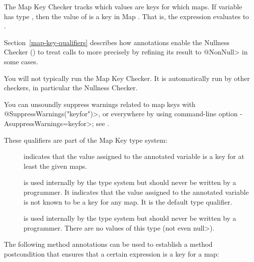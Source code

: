 \htmlhr
{}

The Map Key Checker tracks which values are keys for which maps.  If variable
 has type , then the value of  is a key
in Map .  That is, the expression  evaluates to
.

Section~\ref{map-key-qualifiers} describes how  annotations
enable the
Nullness Checker () to treat calls to
more precisely by refining its result to \<@NonNull> in some cases.

You will not typically run the Map Key Checker.  It is automatically run by
other checkers, in particular the Nullness Checker.

You can unsoundly suppress warnings related to map keys with
\<@SuppressWarnings("keyfor")>, or everywhere by using command-line option
\<-AsuppressWarnings=keyfor>; see .


These qualifiers are part of the Map Key type system:

\begin{description}

\item[]
  indicates that the value assigned to the annotated variable is a key for at
  least the given maps.

\item[]
  is used internally by the type system but should never be written by a
  programmer.  It indicates that the value assigned to the annotated
  variable is not known to be a key for any map.  It is the default type
  qualifier.

\item[]
  is used internally by the type system but should never be written by a
  programmer.  There are no values of this type (not even \<null>).

\end{description}

The following method annotations can be used to establish a method postcondition
that ensures that a certain expression is a key for a map:

